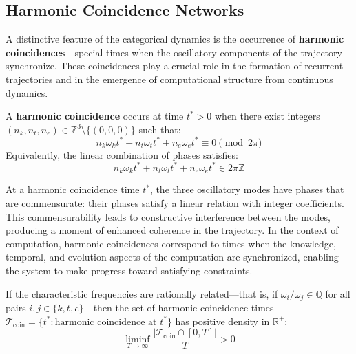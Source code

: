 \subsection{Harmonic Coincidence Networks}

A distinctive feature of the categorical dynamics is the occurrence of \textbf{harmonic coincidences}---special times when the oscillatory components of the trajectory synchronize. These coincidences play a crucial role in the formation of recurrent trajectories and in the emergence of computational structure from continuous dynamics.

\begin{definition}
\label{def:harmonic_coincidence}
A \textbf{harmonic coincidence} occurs at time $t^* > 0$ when there exist integers $(n_k, n_t, n_e) \in \mathbb{Z}^3 \setminus \{(0,0,0)\}$ such that:
\begin{equation}
n_k \omega_k t^* + n_t \omega_t t^* + n_e \omega_e t^* \equiv 0 \pmod{2\pi}
\label{eq:harmonic_coincidence}
\end{equation}
Equivalently, the linear combination of phases satisfies:
\begin{equation}
n_k \omega_k t^* + n_t \omega_t t^* + n_e \omega_e t^* \in 2\pi\mathbb{Z}
\end{equation}
\end{definition}

At a harmonic coincidence time $t^*$, the three oscillatory modes have phases that are commensurate: their phases satisfy a linear relation with integer coefficients. This commensurability leads to constructive interference between the modes, producing a moment of enhanced coherence in the trajectory. In the context of computation, harmonic coincidences correspond to times when the knowledge, temporal, and evolution aspects of the computation are synchronized, enabling the system to make progress toward satisfying constraints.

\begin{proposition}
\label{prop:coincidence_density}
If the characteristic frequencies are rationally related---that is, if $\omega_i/\omega_j \in \mathbb{Q}$ for all pairs $i, j \in \{k, t, e\}$---then the set of harmonic coincidence times $\mathcal{T}_{\text{coin}} = \{t^* : \text{harmonic coincidence at } t^*\}$ has positive density in $\mathbb{R}^+$:
\begin{equation}
\liminf_{T \to \infty} \frac{|\mathcal{T}_{\text{coin}} \cap [0, T]|}{T} > 0
\label{eq:coincidence_density}
\end{equation}
\end{proposition}

